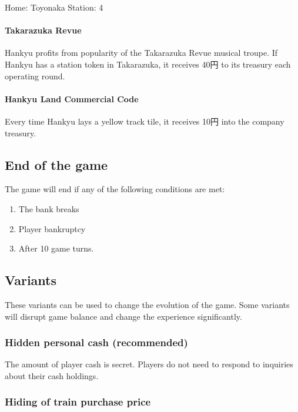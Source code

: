 \documentclass{article}
\begin{document}
\begin{CJK}{UTF8}{min}
\begin{multicols}{2}
\begin{description}
Home: Toyonaka \hfill Station: 4

\paragraph{Takarazuka Revue}
Hankyu profits from popularity of the Takarazuka Revue musical
troupe. If Hankyu has a station token in Takarazuka, it receives
40円 to its treasury each operating round.


\paragraph{Hankyu Land Commercial Code}
Every time Hankyu lays a yellow track tile, it receives 10円 into the
company treasury.

\end{description}

\subsection{End of the game}

The game will end if any of the following conditions are met:
\begin{enumerate}
\item The bank breaks

\item Player bankruptcy

\item After 10 game turns.
\end{enumerate}

\subsection{Variants}

These variants can be used to change the evolution of the game. Some
variants will disrupt game balance and change the experience
significantly.

\subsubsection{Hidden personal cash (recommended)}
The amount of player cash is secret. Players do not need to respond to
inquiries about their cash holdings.

\subsubsection{Hiding of train purchase price}


\end{multicols}
\end{CJK}
\end{document}
